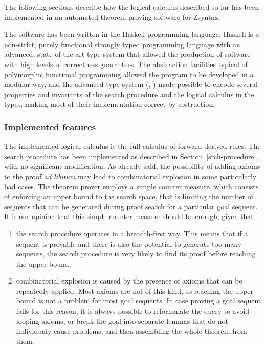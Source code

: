 The following sections describe how the logical calculus described so far has
been implemented in an automated theorem proving software for Zsyntax.

The software has been written in the Haskell programming language.
Haskell is a non-strict, purely functional strongly typed programming language
\cite{a-history-of-haskell}
with an advanced, state-of-the-art type system that allowed the production of
software with high levels of correctness guarantees.
The abstraction facilities typical of polymorphic functional programming allowed
the program to be developed in a modular way, and the advanced type system
(\cite{gadts}, \cite{dependent-haskell})
made possible to encode several properties and invariants of the search
procedure and the logical calculus in the types, making most of their
implementation correct by costruction.

\subsubsection{Implemented features}

The implemented logical calculus is the full calculus of forward derived rules.
The search procedure has been implemented as described in
Section~\ref{srch-procedure}, with no significant modification.
As already said, the possibility of adding axioms to the proof \emph{ad libitum}
may lead to combinatorial explosion in some particularly bad cases.
The theorem prover employs a simple counter measure, which consists of enforcing
an upper bound to the search space, that is limiting the number of sequents that
can be generated during proof search for a particular goal sequent.
It is our opinion that this simple counter measure should be enough, given that

\begin{enumerate}
\item the search procedure operates in a breadth-first way. This means that if a
  sequent is provable and there is also the potential to generate too many
  sequents, the search procedure is very likely to find its proof before reaching
  the upper bound;
\item combinatorial explosion is caused by the presence of axioms that can be
  repeatedly applied. Most axioms are not of this kind, so reaching the upper
  bound is not a problem for most goal sequents. In case proving a goal sequent
  fails for this reason, it is always possible to reformulate the query to avoid
  looping axioms, or break the goal into separate lemmas that do not individualy
  cause problems, and then assembling the whole theorem from them.
\end{enumerate}

